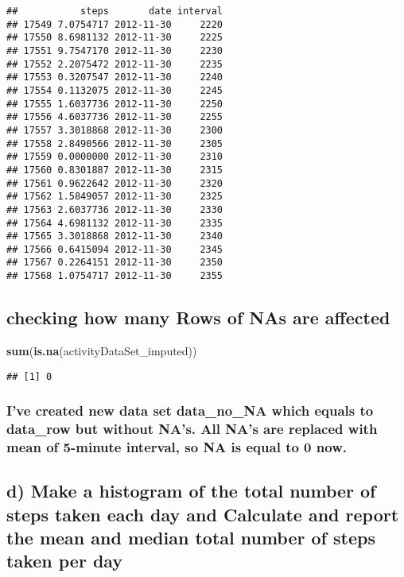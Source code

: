 \documentclass[
]{article}
\newenvironment{Shaded}{\begin{snugshade}}{\end{snugshade}}
\newcommand{\KeywordTok}[1]{\textcolor[rgb]{0.13,0.29,0.53}{\textbf{#1}}}
\newcommand{\NormalTok}[1]{#1}
\begin{document}
\begin{verbatim}
##           steps       date interval
## 17549 7.0754717 2012-11-30     2220
## 17550 8.6981132 2012-11-30     2225
## 17551 9.7547170 2012-11-30     2230
## 17552 2.2075472 2012-11-30     2235
## 17553 0.3207547 2012-11-30     2240
## 17554 0.1132075 2012-11-30     2245
## 17555 1.6037736 2012-11-30     2250
## 17556 4.6037736 2012-11-30     2255
## 17557 3.3018868 2012-11-30     2300
## 17558 2.8490566 2012-11-30     2305
## 17559 0.0000000 2012-11-30     2310
## 17560 0.8301887 2012-11-30     2315
## 17561 0.9622642 2012-11-30     2320
## 17562 1.5849057 2012-11-30     2325
## 17563 2.6037736 2012-11-30     2330
## 17564 4.6981132 2012-11-30     2335
## 17565 3.3018868 2012-11-30     2340
## 17566 0.6415094 2012-11-30     2345
## 17567 0.2264151 2012-11-30     2350
## 17568 1.0754717 2012-11-30     2355
\end{verbatim}

\hypertarget{checking-how-many-rows-of-nas-are-affected}{%
\subsection{checking how many Rows of NAs are
affected}\label{checking-how-many-rows-of-nas-are-affected}}

\begin{Shaded}
\begin{Highlighting}[]
\KeywordTok{sum}\NormalTok{(}\KeywordTok{is.na}\NormalTok{(activityDataSet_imputed))}
\end{Highlighting}
\end{Shaded}

\begin{verbatim}
## [1] 0
\end{verbatim}

\hypertarget{ive-created-new-data-set-data_no_na-which-equals-to-data_row-but-without-nas.-all-nas-are-replaced-with-mean-of-5-minute-interval-so-na-is-equal-to-0-now.}{%
\subsubsection{I've created new data set data\_no\_NA which equals to
data\_row but without NA's. All NA's are replaced with mean of 5-minute
interval, so NA is equal to 0
now.}\label{ive-created-new-data-set-data_no_na-which-equals-to-data_row-but-without-nas.-all-nas-are-replaced-with-mean-of-5-minute-interval-so-na-is-equal-to-0-now.}}

\hypertarget{d-make-a-histogram-of-the-total-number-of-steps-taken-each-day-and-calculate-and-report-the-mean-and-median-total-number-of-steps-taken-per-day}{%
\subsection{d) Make a histogram of the total number of steps taken each
day and Calculate and report the mean and median total number of steps
taken per
day}\label{d-make-a-histogram-of-the-total-number-of-steps-taken-each-day-and-calculate-and-report-the-mean-and-median-total-number-of-steps-taken-per-day}}
\end{document}
